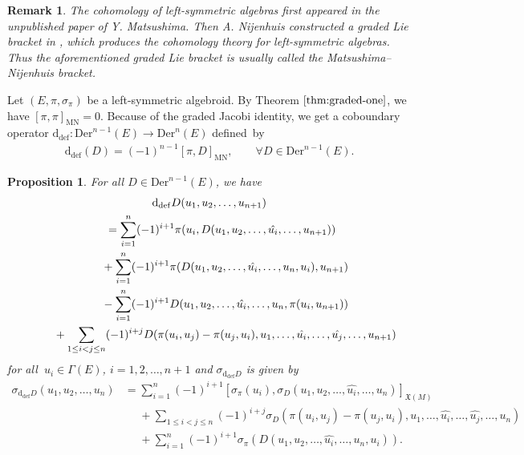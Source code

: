 \documentclass[pdftex]{sigma}%
\numberwithin{equation}{section}
\newtheorem{pro}[thm]{Proposition}
\newtheorem{rmk}[thm]{Remark}
\newcommand{\frkX}{\mathfrak X}
\newcommand{\dM}{\mathrm{d}}
\newcommand{\Der}{\mathrm{Der}}
\newcommand{\MN}{\mathrm{MN}}
\newcommand{\Def}{\mathrm{def}}
\begin{document}
\begin{rmk}
The cohomology of left-symmetric algebras first appeared in the unpublished paper of Y. Matsushima. Then A. Nijenhuis constructed a graded Lie bracket in \cite{Nijenhuis}, which produces the cohomology theory for left-symmetric algebras. Thus the aforementioned graded Lie bracket is usually called the Matsushima--Nijenhuis bracket.	
\end{rmk}	

Let $(E,\pi,\sigma_\pi)$ be a left-symmetric algebroid. By Theorem $\ref{thm:graded-one}$, we have $[\pi,\pi]_{\MN}=0$. Because of the graded Jacobi identity, we get a coboundary operator $\dM_{\Def}\colon \Der^{n-1}(E)\rightarrow \Der^n(E)$ defi\-ned~by
\begin{gather*}
\dM_{\Def}(D)=(-1)^{n-1}[\pi,D]_{\MN}, \qquad
\forall D\in\Der^{n-1}(E).
\end{gather*}

\begin{pro}%
For all $D\in\Der^{n-1}(E)$, we have
\begin{gather}
\dM_{\Def}D(u_1,u_2,\dots,u_{n+1})\nonumber
\\ \qquad
{} =\sum_{i=1}^{n}(-1)^{i+1}\pi(u_i,D(u_1,u_2,\dots,\hat{u_i},\dots,u_{n+1}))\nonumber
\\ \qquad\hphantom{=}
{}+\sum_{i=1}^{n}(-1)^{i+1}\pi(D(u_1,u_2,\dots,\hat{u_i},\dots,u_n,u_i), u_{n+1})\nonumber
\\ \qquad\hphantom{=}
{}-\sum_{i=1}^{n}(-1)^{i+1}D(u_1,u_2,\dots,\hat{u_i},\dots,u_n,\pi(u_i, u_{n+1}))\nonumber
\\ \qquad\hphantom{=}
{}+\sum_{1\leq i<j\leq {n}}(-1)^{i+j}D(\pi(u_i,u_j)-\pi(u_j,u_i),u_1,\dots,\hat{u_i},\dots,\hat{u_j},\dots,u_{n+1})
\label{eq:deformation complex}
\end{gather}
for all $\ u_i\in \Gamma(E)$, $i=1,2,\dots,n+1$ and $\sigma_{\dM_{\Def}D}$
is given by
\begin{align*}
\sigma_{\dM_{\Def}D}(u_1,u_2,\dots,u_n)&= \sum_{i=1}^{n}(-1)^{i+1}[\sigma_\pi(u_i),\sigma_{D}(u_1,u_2,\dots,\hat{u_i},\dots,u_{n})]_{\frkX(M)}
\\
&\phantom{=}+\!\!\!\sum_{1\leq i<j\leq n}\!\!\! (-1)^{i+j}\sigma_{D}(\pi(u_i,u_j)-\pi(u_j,u_i),u_1,\dots,\hat{u_i},\dots,\hat{u_j},\dots,u_n)
\\
&\phantom{=}+\sum_{i=1}^{n}(-1)^{i+1}\sigma_\pi(D(u_1,u_2,\dots,\hat{u_i},\dots,u_n,u_i)).
\end{align*}
\end{pro}
\end{document}
